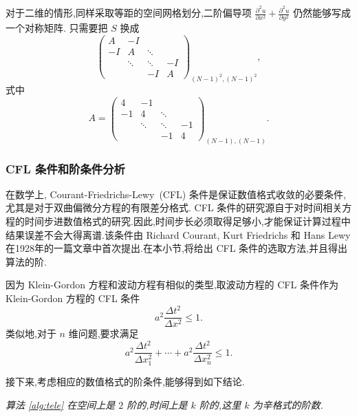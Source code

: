 对于二维的情形,同样采取等距的空间网格划分,二阶偏导项 $\frac{\partial ^2 u}{\partial x^2} + \frac{\partial ^2
u}{\partial y^2}$ 仍然能够写成一个对称矩阵. 只需要把 $S$ 换成
\begin{equation*}
\begin{pmatrix}
A&-I&&\\
-I&A&\ddots&\\
&\ddots&\ddots&-I\\
&&-I&A
\end{pmatrix}_{(N-1)^2,(N-1)^2},
\end{equation*}
式中
\begin{equation*}
A=\begin{pmatrix}
4&-1&&\\
-1&4&\ddots&\\
&\ddots&\ddots&-1\\
&&-1&4
\end{pmatrix}_{(N-1),(N-1)}.
\end{equation*}

\subsubsection{CFL 条件和阶条件分析}
在数学上, Courant-Friedrichs-Lewy~(CFL) 条件是保证数值格式收敛的必要条件,尤其是对于双曲偏微分方程的有限差分格式. CFL 条件的研究源自于对时间相关方程的时间步进数值格式的研究.因此,时间步长必须取得足够小,才能保证计算过程中结果误差不会大得离谱.该条件由 Richard Courant, Kurt Friedrichs 和 Hans Lewy 在1928年的一篇文章中首次提出\cite{courant1967onthe}.在本小节,将给出 CFL 条件的选取方法,并且得出算法的阶.

因为 Klein-Gordon 方程和波动方程有相似的类型,取波动方程的 CFL 条件作为 Klein-Gordon 方程的 CFL 条件
\begin{equation*}
a^2\frac{\Delta t^2}{\Delta x^2}\le 1.
\end{equation*}
类似地,对于 $n$ 维问题,要求满足
\begin{equation*}
a^2 \frac{\Delta t^2}{\Delta x_1^2}+\cdots+a^2 \frac{\Delta t^2}{\Delta x_n^2}\le 1.
\end{equation*}

接下来,考虑相应的数值格式的阶条件,能够得到如下结论.

\begin{theorem}\label{thm:tele}
\emph{算法 \ref{alg:tele} 在空间上是 $2$ 阶的,时间上是 $k$ 阶的,这里 $k$ 为辛格式的阶数.}
\end{theorem}

